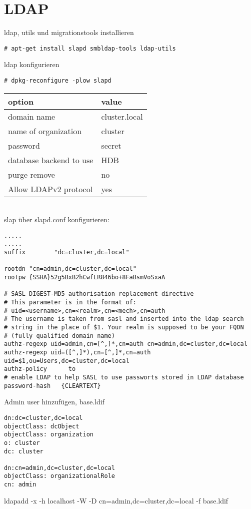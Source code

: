 \chapter{LDAP}
ldap, utils und migrationstools installieren
\begin{lstlisting}[style=Bash]
# apt-get install slapd smbldap-tools ldap-utils
\end{lstlisting}
ldap konfigurieren
\begin{lstlisting}[style=Bash]
# dpkg-reconfigure -plow slapd
\end{lstlisting}
\begin{tabular}{ l | l }
 option & value\\
 \hline
 domain name & cluster.local\\
 name of organization & cluster\\
 password & secret\\
 database backend to use & HDB\\
 purge remove & no\\
 Allow LDAPv2 protocol & yes\\
\end{tabular}
\\

slap über slapd.conf konfigurieren:
\begin{lstlisting}[style=Bash]
.....
.....
suffix        "dc=cluster,dc=local"

rootdn "cn=admin,dc=cluster,dc=local"
rootpw {SSHA}52g5BxB2hCwfLR846bo+8FaBsmVoSxaA

# SASL DIGEST-MD5 authorisation replacement directive
# This parameter is in the format of:
# uid=<username>,cn=<realm>,cn=<mech>,cn=auth
# The username is taken from sasl and inserted into the ldap search 
# string in the place of $1. Your realm is supposed to be your FQDN 
# (fully qualified domain name)
authz-regexp uid=admin,cn=[^,]*,cn=auth cn=admin,dc=cluster,dc=local
authz-regexp uid=([^,]*),cn=[^,]*,cn=auth uid=$1,ou=Users,dc=cluster,dc=local
authz-policy      to
# enable LDAP to help SASL to use passworts stored in LDAP database
password-hash   {CLEARTEXT}
\end{lstlisting}

Admin user hinzufügen, base.ldif
\begin{lstlisting}[style=Bash]
dn:dc=cluster,dc=local
objectClass: dcObject
objectClass: organization
o: cluster
dc: cluster

dn:cn=admin,dc=cluster,dc=local
objectClass: organizationalRole
cn: admin
\end{lstlisting}
ldapadd -x -h localhost -W -D cn=admin,dc=cluster,dc=local -f base.ldif 

